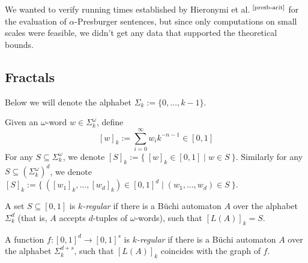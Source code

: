 \documentclass[10pt,usenames,dvipsnames]{article}
\begin{document}
We wanted to verify running times established by Hieronymi et al.$^{\text{~\cite{presb-arit}}}$ for the evaluation of $\alpha$-Presburger sentences, but since only computations on small scales were feasible, we didn't get any data that supported the theoretical bounds.

\subsection{Fractals}\label{sec:fractals}

Below we will denote the alphabet $\Sigma_k := \{ 0, \dots, k - 1 \}$.

\begin{definition}
Given an $\omega$-word $w \in \Sigma^\omega_k$, define
\[
    [w]_k := \sum^\infty_{i = 0} w_i k^{-n - 1} \in [0, 1]
\]
For any $S \subseteq \Sigma^\omega_k$, we denote $[S]_k := \{\ [w]_k \in [0, 1] \mid w \in S\ \}$.
Similarly for any $S \subseteq (\Sigma^\omega_k)^d$, we denote $[S]_k := \{\ ([w_1]_k, \dots, [w_d]_k) \in [0, 1]^d \mid (w_1, \dots, w_d) \in S\ \}$.
\end{definition}

\begin{definition}
A set $S \subseteq [0, 1]$ is \emph{$k$-regular} if there is a B\"uchi automaton $A$ over
the alphabet $\Sigma^d_k$ (that is, $A$ accepts $d$-tuples of $\omega$-words),
such that $[L(A)]_k = S$.
\end{definition}

\begin{definition}
A function $f: [0, 1]^d \to [0, 1]^s$ is \emph{$k$-regular} if there is a B\"uchi automaton $A$
over the alphabet $\Sigma^{d + s}_k$, such that $[L(A)]_k$ coincides with the graph of $f$.
\end{definition}
\end{document}
